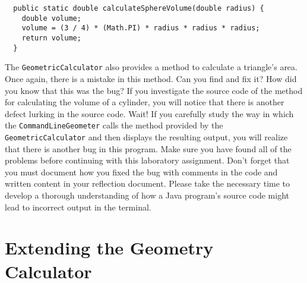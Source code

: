 \documentclass[11pt]{article}
\newcommand{\command}[1]{``\lstinline{#1}''}
\begin{document}
\vspace*{-.05in}
\begin{verbatim}
  public static double calculateSphereVolume(double radius) {
    double volume;
    volume = (3 / 4) * (Math.PI) * radius * radius * radius;
    return volume;
  }
\end{verbatim}
\vspace*{-.05in}

The {\tt GeometricCalculator} also provides a method to calculate a triangle's
area. Once again, there is a mistake in this method. Can you find and fix it?
How did you know that this was the bug? If you investigate the source code of
the method for calculating the volume of a cylinder, you will notice that there
is another defect lurking in the source code. Wait! If you carefully study the
way in which the {\tt CommandLineGeometer} calls the method provided by the {\tt
GeometricCalculator} and then displays the resulting output, you will realize
that there is another bug in this program. Make sure you have found all of the
problems before continuing with this laboratory assignment. Don't forget that
you must document how you fixed the bug with comments in the code and written
content in your reflection document. Please take the necessary time to develop a
thorough understanding of how a Java program's source code might lead to
incorrect output in the terminal.


\section*{Extending the Geometry Calculator}
\end{document}
